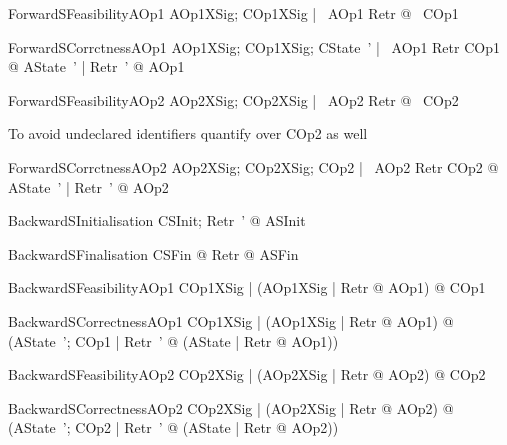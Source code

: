 \begin{theorem}{ForwardSFeasibilityAOp1}
   \forall AOp1XSig; COp1XSig | \pre~AOp1 \land Retr @ \pre~COp1
\end{theorem}

\begin{theorem}{ForwardSCorrctnessAOp1}
   \forall AOp1XSig; COp1XSig; CState~' | \pre~AOp1 \land Retr \land COp1 @
   	\exists AState~' | Retr~' @ AOp1
\end{theorem}

\begin{theorem}{ForwardSFeasibilityAOp2}
   \forall AOp2XSig; COp2XSig | \pre~AOp2 \land Retr @ \pre~COp2
\end{theorem}

To avoid undeclared identifiers quantify over COp2 as well
\begin{theorem}{ForwardSCorrctnessAOp2}
  \forall AOp2XSig; COp2XSig; COp2 | \pre~AOp2 \land Retr \land COp2 @
   	\exists AState~' | Retr~' @ AOp2
\end{theorem}


\begin{theorem}{BackwardSInitialisation}
  \forall CSInit; Retr~' @ ASInit
\end{theorem}

\begin{theorem}{BackwardSFinalisation}
  \forall CSFin @ \exists Retr @ ASFin
\end{theorem}

\begin{theorem}{BackwardSFeasibilityAOp1}
   \forall COp1XSig | (\forall AOp1XSig | Retr @ \pre AOp1) @ \pre COp1
\end{theorem}

\begin{theorem}{BackwardSCorrectnessAOp1}
  \forall COp1XSig | (\forall AOp1XSig | Retr @ \pre AOp1) @
   	(\forall AState~'; COp1 | Retr~' @ (\exists AState | Retr @ AOp1))
\end{theorem}

\begin{theorem}{BackwardSFeasibilityAOp2}
   \forall COp2XSig | (\forall AOp2XSig | Retr @ \pre AOp2) @ \pre COp2
\end{theorem}

\begin{theorem}{BackwardSCorrectnessAOp2}
  \forall COp2XSig | (\forall AOp2XSig | Retr @ \pre AOp2) @
   	(\forall AState~'; COp2 | Retr~' @ (\exists AState | Retr @ AOp2))
\end{theorem}